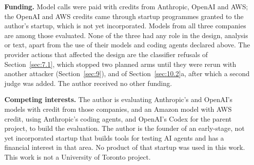 \documentclass[11pt]{article}
\begin{document}
\textbf{Funding.} Model calls were paid with credits from Anthropic, OpenAI and AWS; the OpenAI and AWS credits came through startup programmes granted to the author's startup, which is not yet incorporated. Models from all three companies are among those evaluated. None of the three had any role in the design, analysis or text, apart from the use of their models and coding agents declared above. The provider actions that affected the design are the classifier refusals of Section~\ref{sec:7.1}, which stopped two planned arms until they were rerun with another attacker (Section~\ref{sec:9}), and of Section~\ref{sec:10.2}a, after which a second judge was added. The author received no other funding.

\textbf{Competing interests.} The author is evaluating Anthropic's and OpenAI's models with credit from those companies, and an Amazon model with AWS credit, using Anthropic's coding agents, and OpenAI's Codex for the parent project, to build the evaluation. The author is the founder of an early-stage, not yet incorporated startup that builds tools for testing AI agents and has a financial interest in that area. No product of that startup was used in this work. This work is not a University of Toronto project.
\end{document}
